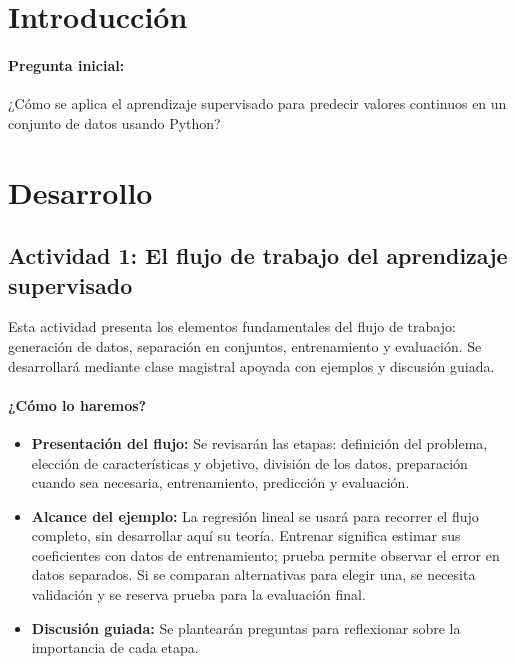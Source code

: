 \documentclass[a4,11pt]{aleph-notas}
\begin{document}
\section*{Introducción}

\paragraph{Pregunta inicial:}
¿Cómo se aplica el aprendizaje supervisado para predecir valores continuos en un conjunto de datos usando Python?

\section*{Desarrollo}

\subsection*{Actividad 1: El flujo de trabajo del aprendizaje supervisado}

Esta actividad presenta los elementos fundamentales del flujo de trabajo: generación de datos, separación en conjuntos, entrenamiento y evaluación. Se desarrollará mediante clase magistral apoyada con ejemplos y discusión guiada.

\paragraph{¿Cómo lo haremos?}
\begin{itemize}[leftmargin=*]
\item \textbf{Presentación del flujo:} Se revisarán las etapas: definición del problema, elección de características y objetivo, división de los datos, preparación cuando sea necesaria, entrenamiento, predicción y evaluación.
\item \textbf{Alcance del ejemplo:} La regresión lineal se usará para recorrer el flujo completo, sin desarrollar aquí su teoría. Entrenar significa estimar sus coeficientes con datos de entrenamiento; prueba permite observar el error en datos separados. Si se comparan alternativas para elegir una, se necesita validación y se reserva prueba para la evaluación final.
\item \textbf{Discusión guiada:} Se plantearán preguntas para reflexionar sobre la importancia de cada etapa.

\end{itemize}
\end{document}
